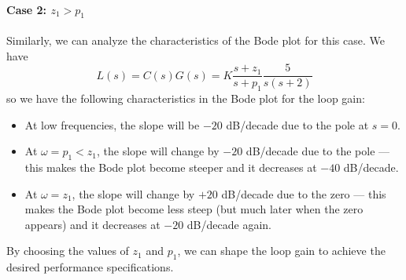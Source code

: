 \documentclass{ee122_notes}
\begin{document}
\paragraph{Case 2: $z_1 > p_1$}
Similarly, we can analyze the characteristics of the Bode plot for this case. We have
\[ L(s) = C(s)G(s) = K \frac{s + z_1}{s + p_1} \frac{5}{s(s + 2)} \]
so we have the following characteristics in the Bode plot for the loop gain:    
\begin{itemize}
    \item At low frequencies, the slope will be $-20$ dB/decade due to the pole at $s = 0$.
    \item At $\omega = p_1 < z_1$, the slope will change by $-20$ dB/decade due to the pole --- this makes the Bode plot become steeper and it decreases at $-40$ dB/decade.
    \item At $\omega = z_1$, the slope will change by $+20$ dB/decade due to the zero --- this makes the Bode plot become less steep (but much later when the zero appears) and it decreases at $-20$ dB/decade again.
\end{itemize}
By choosing the values of $z_1$ and $p_1$, we can shape the loop gain to achieve the desired performance specifications.
\end{document}
